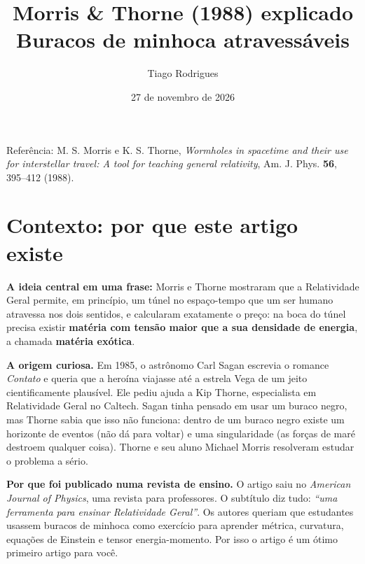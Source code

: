 \documentclass[11pt,a4paper]{article}
\title{\color{azul}\textbf{Morris \& Thorne (1988) explicado}\\[0.3em]
\large Buracos de minhoca atravessáveis}
\author{Tiago Rodrigues}
\date{27 de novembro de 2026}
\begin{document}
\maketitle

\begin{center}
\small Referência: M. S. Morris e K. S. Thorne, \emph{Wormholes in spacetime and their use for interstellar travel:
A tool for teaching general relativity}, Am. J. Phys. \textbf{56}, 395--412 (1988).
\end{center}

\tableofcontents
\newpage

\section{Contexto: por que este artigo existe}

\textbf{A ideia central em uma frase:} Morris e Thorne mostraram que a Relatividade Geral permite, em princípio,
um túnel no espaço-tempo que um ser humano atravessa nos dois sentidos, e calcularam exatamente o preço: na boca do
túnel precisa existir \textbf{matéria com tensão maior que a sua densidade de energia}, a chamada
\textbf{matéria exótica}.

\textbf{A origem curiosa.} Em 1985, o astrônomo Carl Sagan escrevia o romance \emph{Contato} e queria que a heroína
viajasse até a estrela Vega de um jeito cientificamente plausível. Ele pediu ajuda a Kip Thorne, especialista em
Relatividade Geral no Caltech. Sagan tinha pensado em usar um buraco negro, mas Thorne sabia que isso não funciona:
dentro de um buraco negro existe um horizonte de eventos (não dá para voltar) e uma singularidade (as forças de maré
destroem qualquer coisa). Thorne e seu aluno Michael Morris resolveram estudar o problema a sério.

\textbf{Por que foi publicado numa revista de ensino.} O artigo saiu no \emph{American Journal of Physics}, uma
revista para professores. O subtítulo diz tudo: \emph{``uma ferramenta para ensinar Relatividade Geral''}. Os
autores queriam que estudantes usassem buracos de minhoca como exercício para aprender métrica, curvatura, equações
de Einstein e tensor energia-momento. Por isso o artigo é um ótimo primeiro artigo para você.
\end{document}
